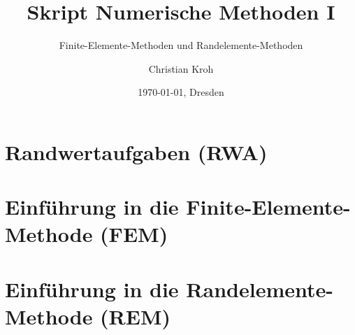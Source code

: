 \documentclass[12pt,german,a4paper]{scrreprt}
\title{Skript Numerische Methoden I}
\subtitle{Finite-Elemente-Methoden und Randelemente-Methoden}
\author{Christian Kroh}
\date{\today{}, Dresden}
\begin{document}
\maketitle
\newpage
\tableofcontents
\newpage
\part{Randwertaufgaben (RWA)}
\newpage


\part{Einführung in die Finite-Elemente-Methode (FEM)}
\newpage


\part{Einführung in die Randelemente-Methode (REM)}
\newpage

\end{document}
